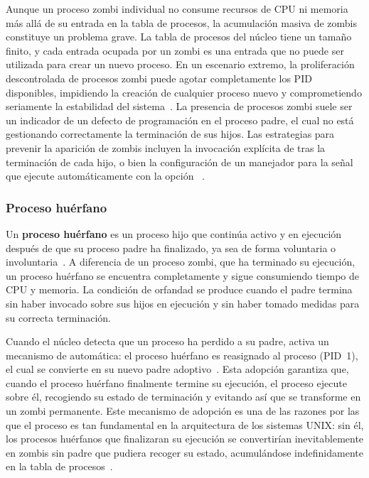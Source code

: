 Aunque un proceso zombi individual no consume recursos de CPU ni memoria más allá de su entrada en la tabla de procesos, la acumulación masiva de zombis constituye un problema grave. La tabla de procesos del núcleo tiene un tamaño finito, y cada entrada ocupada por un zombi es una entrada que no puede ser utilizada para crear un nuevo proceso. En un escenario extremo, la proliferación descontrolada de procesos zombi puede agotar completamente los PID disponibles, impidiendo la creación de cualquier proceso nuevo y comprometiendo seriamente la estabilidad del sistema~\cite{stevens2013}. La presencia de procesos zombi suele ser un indicador de un defecto de programación en el proceso padre, el cual no está gestionando correctamente la terminación de sus hijos. Las estrategias para prevenir la aparición de zombis incluyen la invocación explícita de  tras la terminación de cada hijo, o bien la configuración de un manejador para la señal  que ejecute automáticamente  con la opción ~\cite{kerrisk2010}.

\subsubsection{Proceso huérfano}
\label{subsubsec:proceso_huerfano}

Un \textbf{proceso huérfano} es un proceso hijo que continúa activo y en ejecución después de que su proceso padre ha finalizado, ya sea de forma voluntaria o involuntaria~\cite{love2013}. A diferencia de un proceso zombi, que ha terminado su ejecución, un proceso huérfano se encuentra completamente  y sigue consumiendo tiempo de CPU y memoria. La condición de orfandad se produce cuando el padre termina sin haber invocado  sobre sus hijos en ejecución y sin haber tomado medidas para su correcta terminación.

Cuando el núcleo detecta que un proceso ha perdido a su padre, activa un mecanismo de  automática: el proceso huérfano es reasignado al proceso  (PID~1), el cual se convierte en su nuevo padre adoptivo~\cite{stevens2013}. Esta adopción garantiza que, cuando el proceso huérfano finalmente termine su ejecución, el proceso  ejecute  sobre él, recogiendo su estado de terminación y evitando así que se transforme en un zombi permanente. Este mecanismo de adopción es una de las razones por las que el proceso  es tan fundamental en la arquitectura de los sistemas UNIX: sin él, los procesos huérfanos que finalizaran su ejecución se convertirían inevitablemente en zombis sin padre que pudiera recoger su estado, acumulándose indefinidamente en la tabla de procesos~\cite{kerrisk2010}.


